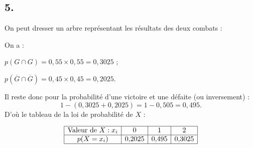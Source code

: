 \subsection*{5.}

On peut dresser un arbre représentant les résultats des deux combats :

\begin{center}
\end{center}

On a :

\( p(G \cap G) = 0{,}55 \times 0{,}55 = 0{,}3025 \) ;

\( p\left(\overline{G} \cap \overline{G}\right) = 0{,}45 \times 0{,}45 = 0{,}2025 \).

Il reste donc pour la probabilité d'une victoire et une défaite (ou inversement) : 
\[
1 - (0{,}3025 + 0{,}2025) = 1 - 0{,}505 = 0{,}495.
\]
D'où le tableau de la loi de probabilité de \( X \) :

\[
\begin{array}{|c|c|c|c|}
\hline
\text{Valeur de } X : x_i & 0 & 1 & 2 \\
\hline
p(X = x_i) & 0{,}2025 & 0{,}495 & 0{,}3025 \\
\hline
\end{array}
\]
